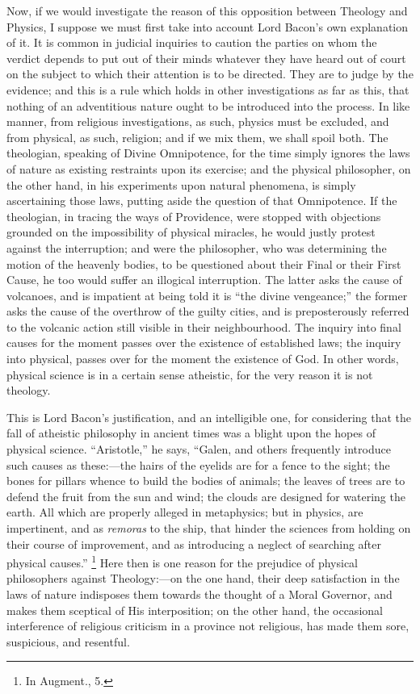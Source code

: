 Now, if we would investigate the reason of this opposition between
Theology and Physics, I suppose we must first take into account Lord
Bacon's own explanation of it. It is common in judicial inquiries to
caution the parties on whom the verdict depends to put out of their
minds whatever they have heard out of court on the subject to which
their attention is to be directed. They are to judge by the evidence;
and this is a rule which holds in other investigations as far as this,
that nothing of an adventitious nature ought to be introduced into the
process. In like manner, from religious investigations, as such,
physics must be excluded, and from physical, as such, religion; and if
we mix them, we shall spoil both. The theologian, speaking of Divine
Omnipotence, for the time simply ignores the laws of nature as
existing restraints upon its exercise; and the physical philosopher,
on the other hand, in his experiments upon natural phenomena, is
simply ascertaining those laws, putting aside the question of that
Omnipotence. If the theologian, in tracing the ways of Providence,
were stopped with objections grounded on the impossibility of physical
miracles, he would justly protest against the interruption; and were
the philosopher, who was determining the motion of the heavenly
bodies, to be questioned about their Final or their First Cause, he
too would suffer an illogical interruption. The latter asks the cause
of volcanoes, and is impatient at being told it is ``the divine
vengeance;'' the former asks the cause of the overthrow of
the guilty cities, and is preposterously referred to the volcanic
action still visible in their neighbourhood. The inquiry into final
causes for the moment passes over the existence of established laws;
the inquiry into physical, passes over for the moment the existence of
God. In other words, physical science is in a certain sense atheistic,
for the very reason it is not theology.

This is Lord Bacon's justification, and an intelligible one, for
considering that the fall of atheistic philosophy in ancient times was
a blight upon the hopes of physical science. ``Aristotle,'' he
says, ``Galen, and others frequently introduce such causes as
these:—the hairs of the eyelids are for a fence to the sight; the
bones for pillars whence to build the bodies of animals; the leaves of
trees are to defend the fruit from the sun and wind; the clouds are
designed for watering the earth. All which are properly alleged in
metaphysics; but in physics, are impertinent, and as \emph{remoras} to
the ship, that hinder the sciences from holding on their course of
improvement, and as introducing a neglect of searching after physical
causes.'' \footnote{In Augment., 5.} Here then
is one reason for the prejudice of physical philosophers against
Theology:—on the one hand, their deep satisfaction in the laws of
nature indisposes them towards the thought of a Moral Governor, and
makes them sceptical of His interposition; on the other hand, the
occasional interference of religious criticism in a province not
religious, has made them sore, suspicious, and resentful.

